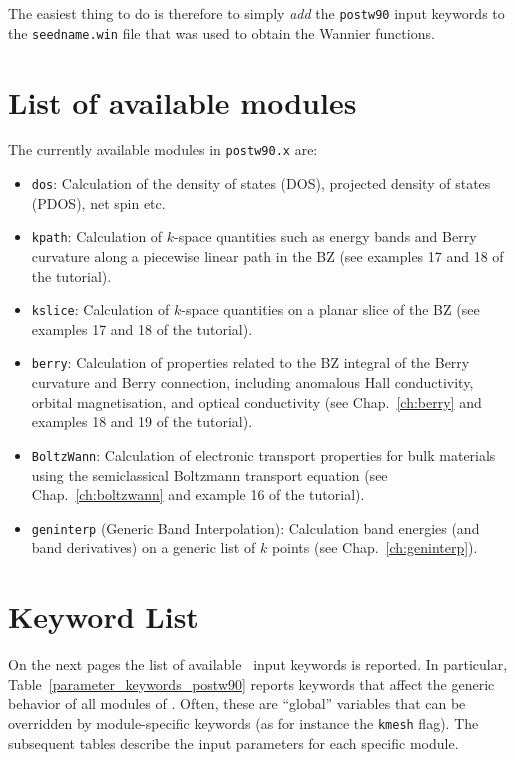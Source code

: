 The easiest thing to do
is therefore to simply \emph{add} the \texttt{postw90} input keywords to
the \texttt{seedname.win} file that was used
to obtain the Wannier functions.

\section{List of available modules}

The currently available modules in \texttt{postw90.x} are:
\begin{itemize}
\item \texttt{dos}: Calculation of the density of states (DOS), projected
  density of states (PDOS), net spin etc.
\item \texttt{kpath}: Calculation of $k$-space quantities such as
  energy bands and Berry curvature along a piecewise linear path in
  the BZ (see examples 17 and 18 of the tutorial).
\item \texttt{kslice}: Calculation of $k$-space quantities on a planar
  slice of the BZ (see examples 17 and 18 of the tutorial).
\item \texttt{berry}: Calculation of properties related to the BZ
  integral of the Berry curvature and Berry connection, including
  anomalous Hall conductivity, orbital magnetisation, and optical
  conductivity (see Chap.~\ref{ch:berry} and examples 18 and 19 of the
  tutorial).
\item \texttt{BoltzWann}: Calculation of electronic transport
  properties for bulk materials using the semiclassical Boltzmann
  transport equation (see Chap.~\ref{ch:boltzwann} and example 16 of
  the tutorial).
\item \texttt{geninterp} (Generic Band Interpolation): Calculation band energies (and band
  derivatives) on a generic list of $k$ points (see Chap.~\ref{ch:geninterp}).
\end{itemize}


\section{Keyword List}
On the next pages the list of available \postw\ input keywords is
reported.  In particular, Table~\ref{parameter_keywords_postw90}
reports keywords that affect the generic behavior of all modules of
\postw. Often, these are ``global'' variables that can be overridden
by module-specific keywords (as for instance the {\tt kmesh}
flag). The subsequent tables describe the input parameters for each
specific module.

